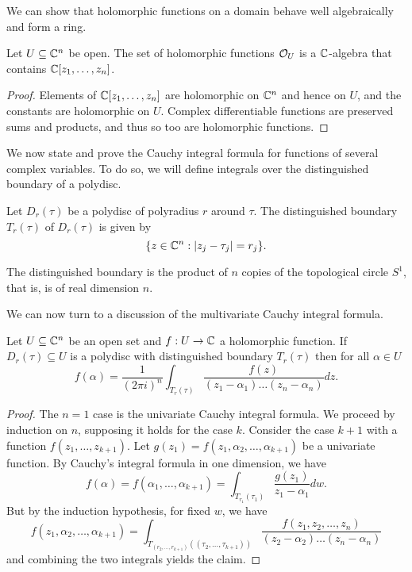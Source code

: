 We can show that holomorphic functions on a domain behave well algebraically and form a ring. 
\begin{proposition}\label{prop: holomorphic functions on a domain form a ring}
    Let $U\subseteq\mathbb{C}^{n}$ be open. The set of holomorphic functions $\mathcal{O}_{U}$ is a $\mathbb{C}$-algebra that contains $\mathbb{C}[z_{1},\dots,z_{n}]$. 
\end{proposition}
\begin{proof}
    Elements of $\mathbb{C}[z_{1},\dots,z_{n}]$ are holomorphic on $\mathbb{C}^{n}$ and hence on $U$, and the constants are holomorphic on $U$. Complex differentiable functions are preserved sums and products, and thus so too are holomorphic functions. 
\end{proof}
We now state and prove the Cauchy integral formula for functions of several complex variables. To do so, we will define integrals over the distinguished boundary of a polydisc. 
\begin{definition}\label{def: distinguished boundary}
    Let $D_{r}(\tau)$ be a polydisc of polyradius $r$ around $\tau$. The distinguished boundary $T_{r}(\tau)$ of $D_{r}(\tau)$ is given by 
    $$\{z\in\mathbb{C}^{n}:|z_{j}-\tau_{j}|=r_{j}\}.$$
\end{definition}
\begin{remark}
    The distinguished boundary is the product of $n$ copies of the topological circle $S^{1}$, that is, is of real dimension $n$. 
\end{remark}
We can now turn to a discussion of the multivariate Cauchy integral formula. 
\begin{theorem}\label{thm: multivariate cauchy integral}
    Let $U\subseteq\mathbb{C}^{n}$ be an open set and $f:U\to\mathbb{C}$ a holomorphic function. If $D_{r}(\tau)\subseteq U$ is a polydisc with distinguished boundary $T_{r}(\tau)$ then for all $\alpha\in U$ 
    $$f(\alpha)=\frac{1}{(2\pi i)^{n}}\int_{T_{r}(\tau)}\frac{f(z)}{(z_{1}-\alpha_{1})\dots(z_{n}-\alpha_{n})}dz.$$
\end{theorem}
\begin{proof}
    The $n=1$ case is the univariate Cauchy integral formula. We proceed by induction on $n$, supposing it holds for the case $k$. Consider the case $k+1$ with a function $f(z_{1},\dots,z_{k+1})$. Let $g(z_{1})=f(z_{1},\alpha_{2},\dots,\alpha_{k+1})$ be a univariate function. By Cauchy's integral formula in one dimension, we have 
    $$f(\alpha)=f(\alpha_{1},\dots,\alpha_{k+1})=\int_{T_{r_{1}}(\tau_{1})}\frac{g(z_{1})}{z_{1}-\alpha_{1}}dw.$$
    But by the induction hypothesis, for fixed $w$, we have 
    $$f(z_{1},\alpha_{2},\dots,\alpha_{k+1})=\int_{T_{(r_{2},\dots,r_{k+1})}((\tau_{2},\dots,\tau_{k+1}))}\frac{f(z_{1},z_{2},\dots,z_{n})}{(z_{2}-\alpha_{2})\dots(z_{n}-\alpha_{n})}$$
    and combining the two integrals yields the claim. 
\end{proof}
